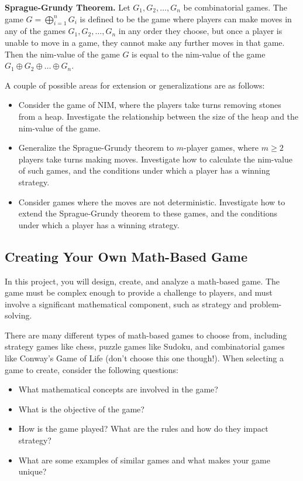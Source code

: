 \documentclass{article}
\begin{document}
\vspace{3mm}
\textbf{Sprague-Grundy Theorem.}
Let $G_1, G_2, \dots, G_n$ be combinatorial games. The game $G = \bigoplus_{i=1}^n G_i$ is defined to be the game where players can make moves in any of the games $G_1, G_2, \dots, G_n$ in any order they choose, but once a player is unable to move in a game, they cannot make any further moves in that game. Then the nim-value of the game $G$ is equal to the nim-value of the game $G_1 \oplus G_2 \oplus \dots \oplus G_n$.

\vspace{3mm}
A couple of possible areas for extension or generalizations are as follows:
\begin{itemize}
\item Consider the game of NIM, where the players take turns removing stones from a heap. Investigate the relationship between the size of the heap and the nim-value of the game.
\item Generalize the Sprague-Grundy theorem to $m$-player games, where $m \ge 2$ players take turns making moves. Investigate how to calculate the nim-value of such games, and the conditions under which a player has a winning strategy.
\item Consider games where the moves are not deterministic. Investigate how to extend the Sprague-Grundy theorem to these games, and the conditions under which a player has a winning strategy.
\end{itemize}

\pagebreak
\subsection*{Creating Your Own Math-Based Game}
In this project, you will design, create, and analyze a math-based game. The game must be complex enough to provide a challenge to players, and must involve a significant mathematical component, such as strategy and problem-solving.

\vspace{3mm}
There are many different types of math-based games to choose from, including strategy games like chess, puzzle games like Sudoku, and combinatorial games like Conway's Game of Life (don't choose this one though!). When selecting a game to create, consider the following questions:

\begin{itemize}
\item What mathematical concepts are involved in the game?
\item What is the objective of the game?
\item How is the game played? What are the rules and how do they impact strategy?
\item What are some examples of similar games and what makes your game unique?
\end{itemize}
\end{document}
